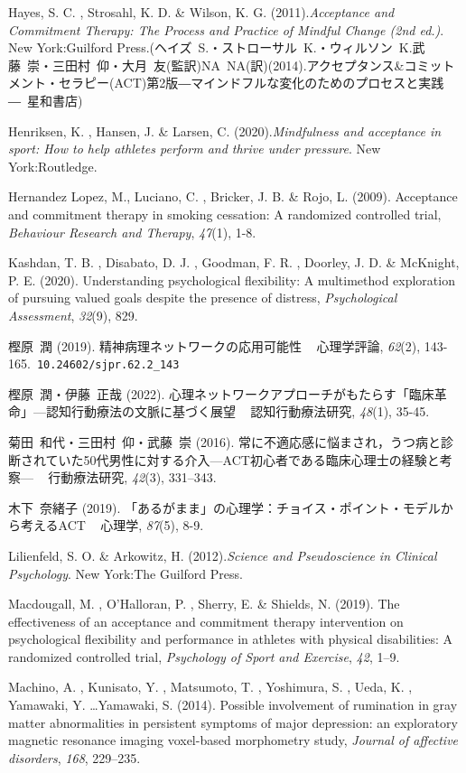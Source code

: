 \documentclass[12pt,a4paper,xelatex,ja=standard]{bxjsarticle}
\begin{document}
Hayes, S. C. , Strosahl, K. D. \& Wilson, K. G.
(2011).\emph{Acceptance and Commitment Therapy: The Process and Practice of Mindful Change (2nd ed.)}.
New York:Guilford
Press.(ヘイズ~S.・ストローサル~K.・ウィルソン~K.武藤~崇・三田村~仰・大月~友(監訳)NA~NA(訳)(2014).アクセプタンス\&コミットメント・セラピー(ACT)第2版―マインドフルな変化のためのプロセスと実践―~星和書店)

Henriksen, K. , Hansen, J. \& Larsen, C.
(2020).\emph{Mindfulness and acceptance in sport: How to help athletes perform and thrive under pressure}.
New York:Routledge.

Hernandez Lopez, M., Luciano, C. , Bricker, J. B. \& Rojo, L. (2009).
Acceptance and commitment therapy in smoking cessation: A randomized
controlled trial, \emph{Behaviour Research and Therapy}, \emph{47}(1),
1-8.

Kashdan, T. B. , Disabato, D. J. , Goodman, F. R. , Doorley, J. D. \&
McKnight, P. E. (2020). Understanding psychological flexibility: A
multimethod exploration of pursuing valued goals despite the presence of
distress, \emph{Psychological Assessment}, \emph{32}(9), 829.

樫原~潤 (2019). 精神病理ネットワークの応用可能性 ~ 心理学評論,
\emph{62}(2), 143-165.~\verb|10.24602/sjpr.62.2_143|

樫原~潤・伊藤~正哉 (2022).
心理ネットワークアプローチがもたらす「臨床革命」---認知行動療法の文脈に基づく展望
~ 認知行動療法研究, \emph{48}(1), 35-45.

菊田~和代・三田村~仰・武藤~崇 (2016).
常に不適応感に悩まされ，うつ病と診断されていた50代男性に対する介入---ACT初心者である臨床心理士の経験と考察---
~ 行動療法研究, \emph{42}(3), 331--343.

木下~奈緒子 (2019).
「あるがまま」の心理学：チョイス・ポイント・モデルから考えるACT ~
心理学, \emph{87}(5), 8-9.

Lilienfeld, S. O. \& Arkowitz, H.
(2012).\emph{Science and Pseudoscience in Clinical Psychology}. New
York:The Guilford Press.

Macdougall, M. , O'Halloran, P. , Sherry, E. \& Shields, N. (2019). The
effectiveness of an acceptance and commitment therapy intervention on
psychological flexibility and performance in athletes with physical
disabilities: A randomized controlled trial,
\emph{Psychology of Sport and Exercise}, \emph{42}, 1--9.

Machino, A. , Kunisato, Y. , Matsumoto, T. , Yoshimura, S. , Ueda, K. ,
Yamawaki, Y. \ldots Yamawaki, S. (2014). Possible involvement of
rumination in gray matter abnormalities in persistent symptoms of major
depression: an exploratory magnetic resonance imaging voxel-based
morphometry study, \emph{Journal of affective disorders}, \emph{168},
229--235.
\end{document}
